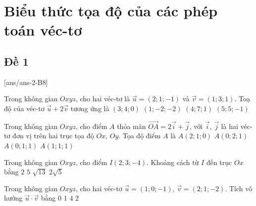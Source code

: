 \section{Biểu thức tọa độ của các phép toán véc-tơ}
\subsection{Đề 1}
[ans/ans-2-B8]
\caulc
\begin{ex}%
	Trong không gian $Oxyz$, cho hai véc-tơ là $\vec{u}=(2;1;-1)$ và $\vec{v}=(1;3;1)$. Toạ độ của véc-tơ $\vec{u}+2\vec{v}$ tương ứng là
	\choice
	{$(3;4;0)$}
	{$(1;-2;-2)$}
	{\True $(4;7;1)$}
	{$(5;5;-1)$}
\end{ex}

\begin{ex}%
	Trong không gian $Oxyz$, cho điểm $A$ thỏa mãn $\overrightarrow{OA}=2\overrightarrow{i}+\overrightarrow{j}$, với $\overrightarrow{i}$, $\overrightarrow{j}$  là hai véc-tơ đơn vị trên hai trục tọa độ $Ox$, $Oy$. Tọa độ điểm $A$ là 
	\choice
	{\True $A(2;1;0)$}
	{$A(0;2;1)$}
	{$A(0;1;1)$}
	{$A(1;1;1)$}
\end{ex}

\begin{ex}%
	Trong không gian $Oxyz$, cho điểm $I(2;3;-4)$. Khoảng cách từ $I$ đến trục $Ox$ bằng
	\choice
	{$2$}
	{\True $5$}
	{$\sqrt{13}$}
	{$2\sqrt{5}$}
\end{ex}

\begin{ex}%
	Trong không gian $Oxyz$, cho hai véc-tơ $\overrightarrow{u}=(1;0;-1)$, $\overrightarrow{v}=(2;1;-2)$. Tích vô hướng $\overrightarrow{u}\cdot \overrightarrow{v}$ bằng
	\choice
	{$0$}
	{$1$}
	{\True $4$}
	{$2$}
\end{ex}

